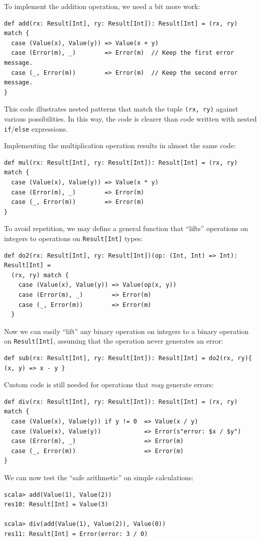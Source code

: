 To implement the addition operation, we need a bit more work:
\begin{lstlisting}
def add(rx: Result[Int], ry: Result[Int]): Result[Int] = (rx, ry) match {
  case (Value(x), Value(y)) => Value(x + y)
  case (Error(m), _)        => Error(m)  // Keep the first error message.
  case (_, Error(m))        => Error(m)  // Keep the second error message.
}
\end{lstlisting}
This code illustrates nested patterns that match the tuple \lstinline!(rx, ry)!
against various possibilities. In this way, the code is clearer than
code written with nested \lstinline!if!/\lstinline!else! expressions.

Implementing the multiplication operation results in almost the same
code:
\begin{lstlisting}
def mul(rx: Result[Int], ry: Result[Int]): Result[Int] = (rx, ry) match {
  case (Value(x), Value(y)) => Value(x * y)
  case (Error(m), _)        => Error(m)
  case (_, Error(m))        => Error(m)
}
\end{lstlisting}
To avoid repetition, we may define a general function that \textsf{``}lifts\textsf{''}
operations on integers to operations on \lstinline!Result[Int]! types:
\begin{lstlisting}
def do2(rx: Result[Int], ry: Result[Int])(op: (Int, Int) => Int): Result[Int] =
  (rx, ry) match {
    case (Value(x), Value(y)) => Value(op(x, y))
    case (Error(m), _)        => Error(m)
    case (_, Error(m))        => Error(m)
  }
\end{lstlisting}
Now we can easily \textsf{``}lift\textsf{''} any binary operation on integers to a
binary operation on \lstinline!Result[Int]!, assuming that the operation
never generates an error:
\begin{lstlisting}
def sub(rx: Result[Int], ry: Result[Int]): Result[Int] = do2(rx, ry){ (x, y) => x - y }
\end{lstlisting}
 Custom code is still needed for operations that \emph{may} generate
errors:
\begin{lstlisting}
def div(rx: Result[Int], ry: Result[Int]): Result[Int] = (rx, ry) match {
  case (Value(x), Value(y)) if y != 0  => Value(x / y)
  case (Value(x), Value(y))            => Error(s"error: $x / $y")
  case (Error(m), _)                   => Error(m)
  case (_, Error(m))                   => Error(m)
}
\end{lstlisting}
We can now test the \textsf{``}safe arithmetic\textsf{''} on simple calculations:
\begin{lstlisting}
scala> add(Value(1), Value(2))
res10: Result[Int] = Value(3)

scala> div(add(Value(1), Value(2)), Value(0))
res11: Result[Int] = Error(error: 3 / 0)
\end{lstlisting}
